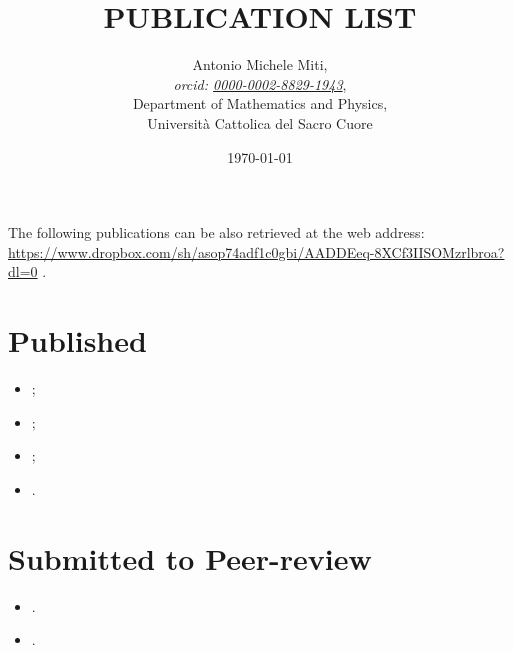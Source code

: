 \documentclass{article}
\title{PUBLICATION LIST}
\date{\today}
\author{
	Antonio Michele Miti,\\
	\emph{orcid: \href{https://orcid.org/0000-0002-8829-1943}{0000-0002-8829-1943}},
	\\
	Department of Mathematics and Physics,\\
	Università Cattolica del Sacro Cuore
}
\begin{document}
  

	\maketitle

	\noindent
  The following publications can be also retrieved at the web address:
  \\ 
  \url{https://www.dropbox.com/sh/asop74adf1c0gbi/AADDEeq-8XCf3IISOMzrlbroa?dl=0}
  .


  \section*{Published}
	  \begin{itemize}
 	   \item {};
 	   \item {};
 	   \item {};
 	   \item {}.
	  \end{itemize}



  \section*{Submitted to Peer-review}
	  \begin{itemize}
    	   \item {}.
 	   \item {}.
	  \end{itemize}

%  

  
\end{document}
